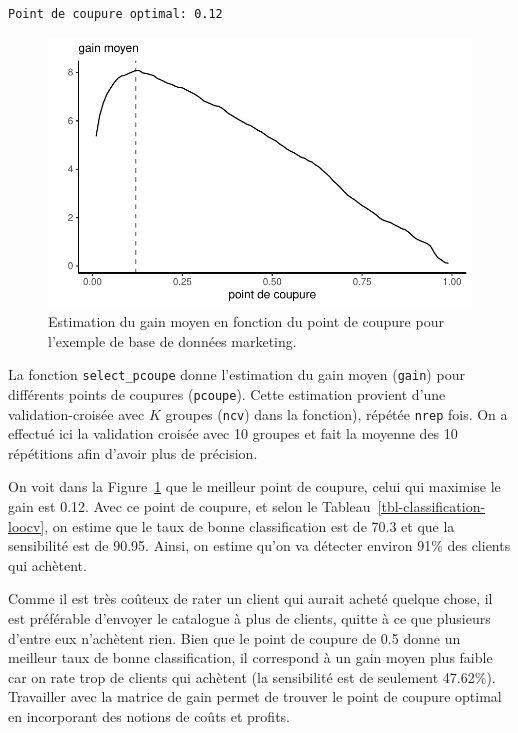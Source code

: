 \documentclass[
  11pt,
  letterpaper,
]{scrbook}
\theoremstyle{definition}
\theoremstyle{remark}
\begin{document}
\begin{verbatim}
Point de coupure optimal: 0.12 
\end{verbatim}

\begin{figure}[ht!]

{\centering \includegraphics{reglogistique_files/figure-pdf/fig-coupure-pondere-1.pdf}

}

\caption{\label{fig-coupure-pondere}Estimation du gain moyen en fonction
du point de coupure pour l'exemple de base de données marketing.}

\end{figure}

La fonction \texttt{select\_pcoupe} donne l'estimation du gain moyen
(\texttt{gain}) pour différents points de coupures (\texttt{pcoupe}).
Cette estimation provient d'une validation-croisée avec \(K\) groupes
(\texttt{ncv}) dans la fonction), répétée \texttt{nrep} fois. On a
effectué ici la validation croisée avec 10 groupes et fait la moyenne
des 10 répétitions afin d'avoir plus de précision.

On voit dans la Figure~\ref{fig-coupure-pondere} que le meilleur point
de coupure, celui qui maximise le gain est 0.12. Avec ce point de
coupure, et selon le Tableau~\ref{tbl-classification-loocv}, on estime
que le taux de bonne classification est de 70.3 et que la sensibilité
est de 90.95. Ainsi, on estime qu'on va détecter environ 91\% des
clients qui achètent.

Comme il est très coûteux de rater un client qui aurait acheté quelque
chose, il est préférable d'envoyer le catalogue à plus de clients,
quitte à ce que plusieurs d'entre eux n'achètent rien. Bien que le point
de coupure de 0.5 donne un meilleur taux de bonne classification, il
correspond à un gain moyen plus faible car on rate trop de clients qui
achètent (la sensibilité est de seulement 47.62\%). Travailler avec la
matrice de gain permet de trouver le point de coupure optimal en
incorporant des notions de coûts et profits.
\end{document}
